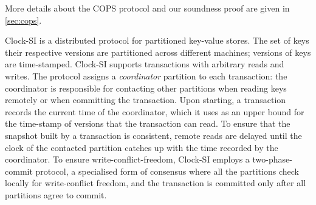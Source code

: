 More details about the COPS protocol and our soundness proof are given in \cref{sec:cops}.

Clock-SI is a distributed protocol for partitioned key-value stores. The set of keys  
their respective versions are partitioned across different machines; versions of keys are time-stamped. 
Clock-SI supports transactions with arbitrary reads and writes. 
The protocol assigns a \emph{coordinator} partition to each transaction: the coordinator   
is responsible for contacting other partitions when reading keys remotely or 
when committing the transaction. Upon starting, a transaction records 
the current time of the coordinator, which it uses as an upper bound for the time-stamp 
of versions that the transaction can read. To ensure that the snapshot built by a transaction is consistent, 
remote reads are delayed until the clock of the contacted partition catches up with the time recorded by 
the coordinator. To ensure write-conflict-freedom, Clock-SI employs a two-phase-commit protocol, a specialised 
form of consensus where all the partitions check locally for write-conflict freedom, and the transaction 
is committed only after all partitions agree to commit.

